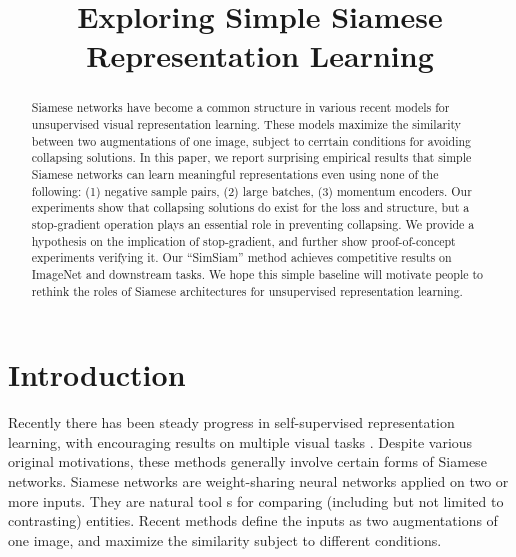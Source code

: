\documentclass[conference]{IEEEtran}
\begin{document}
\title{Exploring Simple Siamese Representation Learning}

\author{
}

\maketitle

\begin{abstract}
Siamese networks have become a common structure in various recent models for unsupervised visual representation learning. These models maximize the similarity
between two augmentations of one image, subject to cerrtain conditions for avoiding collapsing solutions. In this paper, we report surprising empirical results that simple Siamese networks 
can learn meaningful representations even using none of the following: (1) negative sample pairs, (2) large batches, (3) momentum encoders.
Our experiments show that collapsing solutions do exist for the loss and structure, but a stop-gradient operation plays an essential role in preventing collapsing. 
We provide a hypothesis on the implication of stop-gradient, and further show proof-of-concept experiments verifying it. Our ``SimSiam'' method achieves competitive results on ImageNet and downstream tasks.
We hope this simple baseline will motivate people to rethink the roles of Siamese architectures for unsupervised representation learning.
\end{abstract}


\section{Introduction}
Recently there has been steady progress in self-supervised representation learning, with encouraging results on multiple visual tasks \cite{b1}.
Despite various original motivations, these methods generally involve certain forms of Siamese networks. Siamese networks are weight-sharing neural networks applied on two or more inputs.
They are natural tool s for comparing (including but not limited to contrasting) entities. Recent methods define the inputs as two augmentations of one image, and maximize the similarity subject to different conditions.
\end{document}
